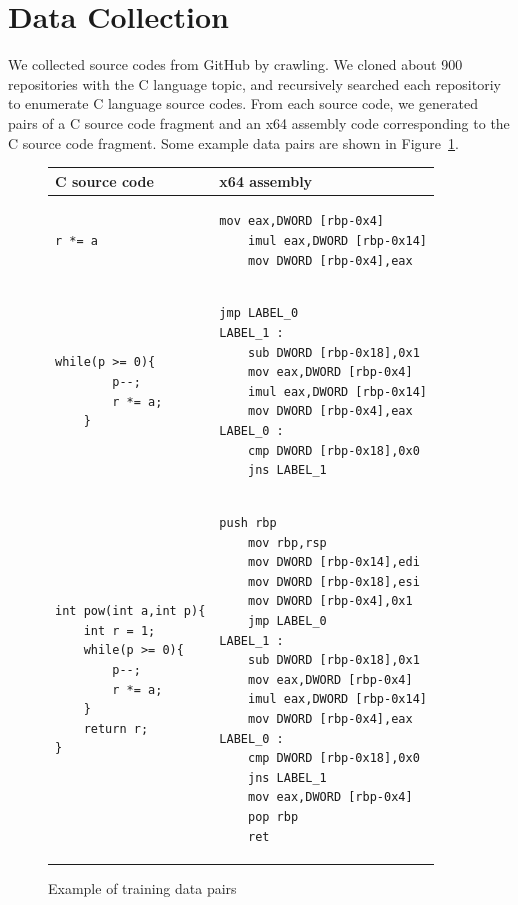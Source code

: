 \documentclass[11pt]{jarticle}
\begin{document}
\section{Data Collection}
We collected source codes from GitHub \citep{github} by crawling.
We cloned about 900 repositories with the C language topic, 
and recursively searched each repositoriy to enumerate C language source codes.
From each source code, we generated pairs of a C source code fragment and an x64 assembly code corresponding to the C source code fragment.
Some example data pairs are shown in Figure~\ref{fig:pairsoffragments}. 

\begin{figure}
	\begin{tabular}{|l|l|} \hline
	 C source code & x64 assembly \\ \hline 
		\begin{lstlisting}[style=Csample]
		r *= a
		\end{lstlisting}
		&
		\begin{lstlisting}[style=Asmsample]
	mov eax,DWORD [rbp-0x4]
	imul eax,DWORD [rbp-0x14]
	mov DWORD [rbp-0x4],eax
		\end{lstlisting} \\ \hline	
		\begin{lstlisting}[style=Csample]
	while(p >= 0){
		p--;
		r *= a;
	}
		\end{lstlisting}
		&
		\begin{lstlisting}[style=Asmsample]
	jmp LABEL_0
LABEL_1 :
	sub DWORD [rbp-0x18],0x1
	mov eax,DWORD [rbp-0x4]
	imul eax,DWORD [rbp-0x14]
	mov DWORD [rbp-0x4],eax
LABEL_0 :
	cmp DWORD [rbp-0x18],0x0
	jns LABEL_1
		\end{lstlisting} \\ \hline		
		\begin{lstlisting}[style=Csample]
int pow(int a,int p){
	int r = 1;
	while(p >= 0){
		p--;
		r *= a;
	}
	return r;
}
		\end{lstlisting}
		&
		\begin{lstlisting}[style=Asmsample]
	push rbp
	mov rbp,rsp
	mov DWORD [rbp-0x14],edi
	mov DWORD [rbp-0x18],esi
	mov DWORD [rbp-0x4],0x1
	jmp LABEL_0
LABEL_1 :
	sub DWORD [rbp-0x18],0x1
	mov eax,DWORD [rbp-0x4]
	imul eax,DWORD [rbp-0x14]
	mov DWORD [rbp-0x4],eax
LABEL_0 :
	cmp DWORD [rbp-0x18],0x0
	jns LABEL_1
	mov eax,DWORD [rbp-0x4]
	pop rbp
	ret
		\end{lstlisting} \\ \hline
	\end{tabular}
	\caption{Example of training data pairs}
	\label{fig:pairsoffragments}
\end{figure}
\end{document}
